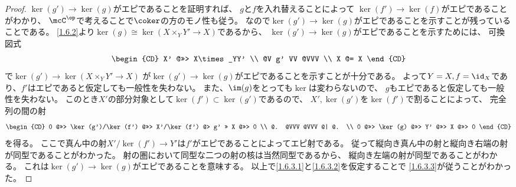 \documentclass[uplatex,dvipdfmx]{jsarticle}
\begin{document}
\begin{proof}
  \(\ker(g')\to \ker(g)\)がエピであることを証明すれば、
  \(g\)と\(f\)を入れ替えることによって
  \(\ker(f')\to \ker(f)\)がエピであることがわかり、
  \(\mcC^{\op}\)で考えることで\(\coker\)の方のモノ性も従う。
  なので\(\ker(g')\to \ker(g)\)がエピであることを示すことが残っていることである。
  \ref{1.6.2}より\(\ker(g)\cong \ker(X\times_YY'\to X)\)であるから、
  \(\ker(g')\to \ker(g)\)がエピであることを示すためには、
  可換図式
  \[
  \begin{CD}
    X' @>>> X\times_YY' \\
    @V g' VV @VVV \\
    X @= X
  \end{CD}
  \]
  で\(\ker(g')\to \ker(X\times_YY'\to X)\)
  が\(\ker(g')\to \ker(g)\)がエピであることを示すことが十分である。
  よって\(Y=X,f=\id_X\)であり、\(f'\)はエピであると仮定しても一般性を失わない。
  また、\(\im(g)\)をとっても\(\ker\)は変わらないので、
  \(g\)もエピであると仮定しても一般性を失わない。
  このとき\(X'\)の部分対象として\(\ker(f')\subset \ker(g')\)であるので、
  \(X',\ker(g')\)を\(\ker(f')\)で割ることによって、
  完全列の間の射
  \[
  \begin{CD}
    0 @>>> \ker(g')/\ker(f') @>>> X'/\ker(f') @> g' >> X @>>> 0 \\
    @. @VVV @VVV @| @. \\
    0 @>>> \ker(g) @>>> Y' @>>> X @>>> 0
  \end{CD}
  \]
  を得る。
  ここで真ん中の射\(X'/\ker(f')\to Y'\)は\(f'\)がエピであることによってエピ射である。
  従って縦向き真ん中の射と縦向き右端の射が同型であることがわかった。
  射の圏において同型な二つの射の核は当然同型であるから、
  縦向き左端の射が同型であることがわかる。
  これは\(\ker(g')\to \ker(g)\)がエピであることを意味する。
  以上で\ref{1.6.3.1}と\ref{1.6.3.2}を仮定することで
  \ref{1.6.3.3}が従うことがわかった。


\end{proof}
\end{document}
